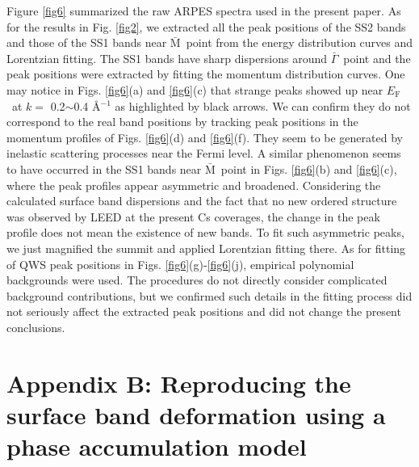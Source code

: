 \documentclass[reprint,secnumarabic,amssymb, nobibnotes, aps, prl,superscriptaddress,showpacs]{revtex4-1}
\def\gb{$\bar{\Gamma}$\ }
\def\mb{$\bar{\mathrm{M}}$\ }
\def\EF{$E_{\mathrm{F}}$\ }
\begin{document}
Figure \ref{fig6} summarized the raw ARPES spectra used in the present paper. As for the results in Fig. \ref{fig2}, we extracted all the peak positions of the SS2 bands and those of the SS1 bands near \mb point from the energy distribution curves and Lorentzian fitting. The SS1 bands have sharp dispersions around \gb point and the peak positions were extracted by fitting the momentum distribution curves. One may notice in Figs. \ref{fig6}(a) and \ref{fig6}(c) that strange peaks showed up near \EF at $k=$ 0.2$\sim$0.4 \AA$^{-1}$ as highlighted by black arrows. We can confirm they do not correspond to the real band positions by tracking peak positions in the momentum profiles of Figs. \ref{fig6}(d) and \ref{fig6}(f). They seem to be generated by inelastic scattering processes near the Fermi level. A similar phenomenon seems to have occurred in the SS1 bands near \mb point in Figs. \ref{fig6}(b) and \ref{fig6}(c), where the peak profiles appear asymmetric and broadened. Considering the calculated surface band dispersions and the fact that no new ordered structure was observed by LEED at the present Cs coverages, the change in the peak profile does not mean the existence of new bands. To fit such asymmetric peaks, we just magnified the summit and applied Lorentzian fitting there. As for fitting of QWS peak positions in Figs. \ref{fig6}(g)-\ref{fig6}(j), empirical polynomial backgrounds were used. The procedures do not directly consider complicated background contributions, but we confirmed such details in the fitting process did not seriously affect the extracted peak positions and did not change the present conclusions.

\section{Appendix B: Reproducing the surface band deformation using a phase accumulation model}
\end{document}
